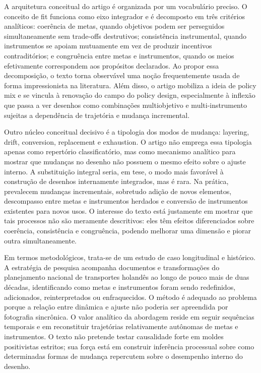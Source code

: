 \documentclass[12pt,a4paper]{article}
\begin{document}
A arquitetura conceitual do artigo é organizada por um vocabulário preciso. O conceito de fit funciona como eixo integrador e é decomposto em três critérios analíticos: coerência de metas, quando objetivos podem ser perseguidos simultaneamente sem trade-offs destrutivos; consistência instrumental, quando instrumentos se apoiam mutuamente em vez de produzir incentivos contraditórios; e congruência entre metas e instrumentos, quando os meios efetivamente correspondem aos propósitos declarados. Ao propor essa decomposição, o texto torna observável uma noção frequentemente usada de forma impressionista na literatura. Além disso, o artigo mobiliza a ideia de policy mix e se vincula à renovação do campo do policy design, especialmente à inflexão que passa a ver desenhos como combinações multiobjetivo e multi-instrumento sujeitas a dependência de trajetória e mudança incremental. \parencite{geet2019_policy_design,lima2021_conectando_problemas}

Outro núcleo conceitual decisivo é a tipologia dos modos de mudança: layering, drift, conversion, replacement e exhaustion. O artigo não emprega essa tipologia apenas como repertório classificatório, mas como mecanismo analítico para mostrar que mudanças no desenho não possuem o mesmo efeito sobre o ajuste interno. A substituição integral seria, em tese, o modo mais favorável à construção de desenhos internamente integrados, mas é rara. Na prática, prevalecem mudanças incrementais, sobretudo adição de novos elementos, descompasso entre metas e instrumentos herdados e conversão de instrumentos existentes para novos usos. O interesse do texto está justamente em mostrar que tais processos não são meramente descritivos: eles têm efeitos diferenciados sobre coerência, consistência e congruência, podendo melhorar uma dimensão e piorar outra simultaneamente. \parencite{geet2019_policy_design}

Em termos metodológicos, trata-se de um estudo de caso longitudinal e histórico. A estratégia de pesquisa acompanha documentos e transformações do planejamento nacional de transportes holandês ao longo de pouco mais de duas décadas, identificando como metas e instrumentos foram sendo redefinidos, adicionados, reinterpretados ou enfraquecidos. O método é adequado ao problema porque a relação entre dinâmica e ajuste não poderia ser apreendida por fotografia sincrônica. O valor analítico da abordagem reside em seguir sequências temporais e em reconstituir trajetórias relativamente autônomas de metas e instrumentos. O texto não pretende testar causalidade forte em moldes positivistas estritos; sua força está em construir inferência processual sobre como determinadas formas de mudança repercutem sobre o desempenho interno do desenho. \parencite{geet2019_policy_design}
\end{document}
